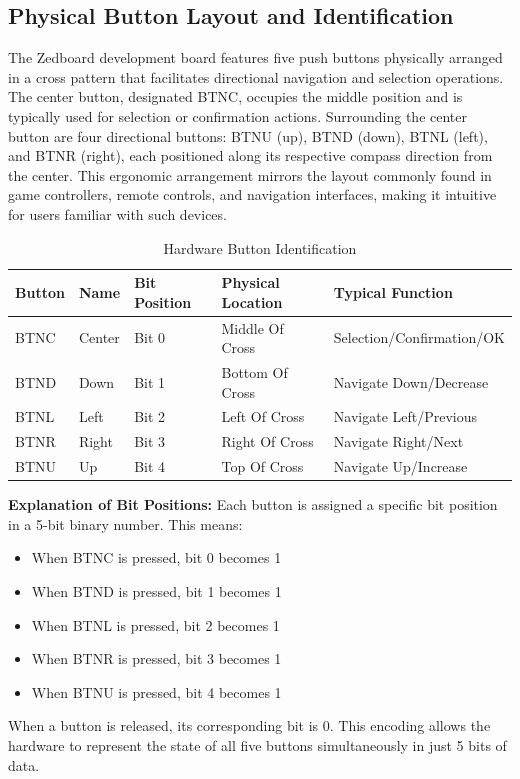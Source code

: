 \subsection{Physical Button Layout and Identification}
The Zedboard development board features five push buttons physically arranged in a cross pattern that facilitates directional navigation and selection operations. The center button, designated BTNC, occupies the middle position and is typically used for selection or confirmation actions. Surrounding the center button are four directional buttons: BTNU (up), BTND (down), BTNL (left), and BTNR (right), each positioned along its respective compass direction from the center. This ergonomic arrangement mirrors the layout commonly found in game controllers, remote controls, and navigation interfaces, making it intuitive for users familiar with such devices.

\begin{table}[H]
    \centering
    \caption{Push Button Descriptions}
    \begin{tabular}{|l|l|l|l|l|}
        \hline
        \textbf{Button} & \textbf{Name} & \textbf{Bit Position} & \textbf{Physical Location} & \textbf{Typical Function} \\
        \hline
        BTNC & Center & Bit 0 & Middle Of Cross & Selection/Confirmation/OK \\
        \hline
        BTND & Down   & Bit 1 & Bottom Of Cross & Navigate Down/Decrease \\
        \hline
        BTNL & Left   & Bit 2 & Left Of Cross   & Navigate Left/Previous \\
        \hline
        BTNR & Right  & Bit 3 & Right Of Cross  & Navigate Right/Next \\
        \hline
        BTNU & Up     & Bit 4 & Top Of Cross    & Navigate Up/Increase \\
        \hline
    \end{tabular}
    \caption{Hardware Button Identification}
    \label{tab:push-buttons}
\end{table}

\textbf{Explanation of Bit Positions:}
Each button is assigned a specific bit position in a 5-bit binary number. This means:

\begin{itemize}
\item When BTNC is pressed, bit 0 becomes 1
\item When BTND is pressed, bit 1 becomes 1
\item When BTNL is pressed, bit 2 becomes 1
\item When BTNR is pressed, bit 3 becomes 1
\item When BTNU is pressed, bit 4 becomes 1
\end{itemize}
When a button is released, its corresponding bit is 0. This encoding allows the hardware to represent the state of all five buttons simultaneously in just 5 bits of data.

